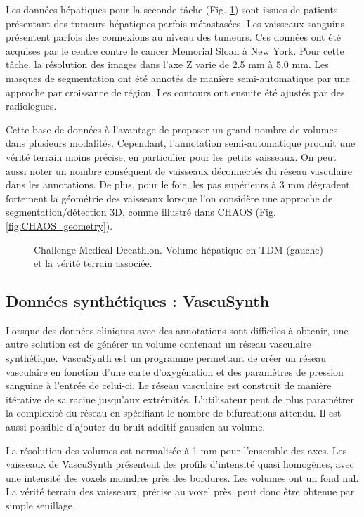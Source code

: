 Les données hépatiques pour la seconde tâche (Fig. \ref{fig:MD_examples}) sont issues de patients présentant des tumeurs hépatiques parfois métastasées. Les vaisseaux sanguins présentent parfois des connexions au niveau des tumeurs. Ces données ont été acquises par le centre contre le cancer Memorial Sloan à New York. Pour cette tâche, la résolution des images dans l'axe Z varie de 2.5 mm à 5.0 mm. Les masques de segmentation ont été annotés de manière semi-automatique par une approche par croissance de région. Les contours ont ensuite été ajustés par des radiologues.

Cette base de données à l'avantage de proposer un grand nombre de volumes dans plusieurs modalités. Cependant, l'annotation semi-automatique produit une vérité terrain moins précise, en particulier pour les petits vaisseaux. On peut aussi noter un nombre conséquent de vaisseaux déconnectés du réseau vasculaire dans les annotations. De plus, pour le foie, les pas supérieurs à 3 mm dégradent fortement la géométrie des vaisseaux lorsque l'on considère une approche de segmentation/détection 3D, comme illustré dans CHAOS (Fig. \ref{fig:CHAOS_geometry}).

\begin{figure}
    \centering
    \caption{Challenge Medical Decathlon. Volume hépatique en TDM (gauche) et la vérité terrain associée.}
    \label{fig:MD_examples}
\end{figure}

\subsection{Données synthétiques : VascuSynth}

Lorsque des données cliniques avec des annotations sont difficiles à obtenir, une autre solution est de générer un volume contenant un réseau vasculaire synthétique. VascuSynth est un programme permettant de créer un réseau vasculaire en fonction d'une carte d'oxygénation et des paramètres de pression sanguine à l'entrée de celui-ci. Le réseau vasculaire est construit de manière itérative de sa racine jusqu'aux extrémités. L'utilisateur peut de plus paramétrer la complexité du réseau en spécifiant le nombre de bifurcations attendu. Il est aussi possible d'ajouter du bruit additif gaussien au volume.

La résolution des volumes est  normalisée à 1 mm pour l'ensemble des axes. Les vaisseaux de VascuSynth présentent des profils d'intensité quasi homogènes, avec une intensité des voxels moindres près des bordures. Les volumes ont un fond nul. La vérité terrain des vaisseaux, précise au voxel près, peut donc être obtenue par simple seuillage.

